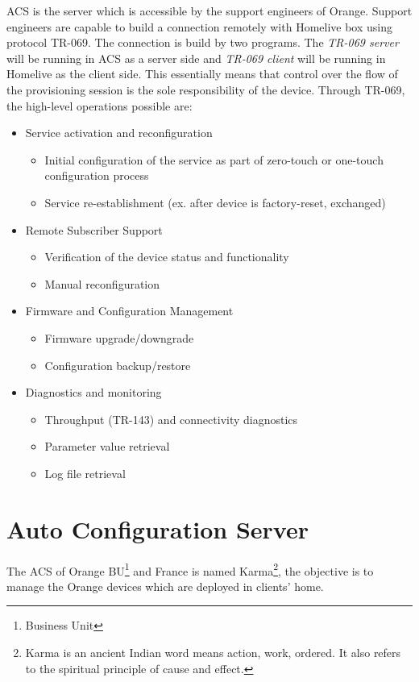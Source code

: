 ACS is the server which is accessible by the support engineers of Orange. Support engineers are capable to build a connection remotely with Homelive box using protocol TR-069. The connection is build by two programs. The \textit{TR-069 server} will be running in ACS as a server side and \textit{TR-069 client} will be running in Homelive as the client side. This essentially means that control over the flow of the provisioning session is the sole responsibility of the device. Through TR-069, the high-level operations possible are:
\begin{itemize}
  \item Service activation and reconfiguration
  \begin{itemize}
    \item Initial configuration of the service as part of zero-touch or one-touch configuration process
    \item Service re-establishment (ex. after device is factory-reset, exchanged)
  \end{itemize}
  \item Remote Subscriber Support
  \begin{itemize}
    \item Verification of the device status and functionality
    \item Manual reconfiguration
  \end{itemize}
  \item Firmware and Configuration Management
  \begin{itemize}
    \item Firmware upgrade/downgrade
    \item Configuration backup/restore
  \end{itemize}
  \item Diagnostics and monitoring
  \begin{itemize}
    \item Throughput (TR-143) and connectivity diagnostics
    \item Parameter value retrieval
    \item Log file retrieval
  \end{itemize}
\end{itemize}
\section{Auto Configuration Server}
The ACS of Orange BU\footnote{Business Unit} and France is named Karma\footnote{Karma is an ancient Indian word means action, work, ordered. It also refers to the spiritual principle of cause and effect.}, the objective is to manage the Orange devices which are deployed in clients' home.

